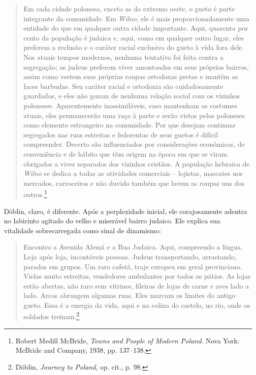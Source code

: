 \begin{quote}
Em cada cidade polonesa, exceto as do extremo oeste, o gueto é parte
integrante da comunidade. Em \textit{Wilno}, ele é mais proporcionadamente uma
entidade do que em qualquer outra cidade importante. Aqui, quarenta por
cento da população é judaica e, aqui, como em qualquer outro lugar, eles
preferem a reclusão e o caráter racial exclusivo do gueto à vida fora
dele. Nos atuais tempos modernos, nenhuma tentativa foi feita contra a
segregação; os judeus preferem viver amontoados em seus próprios
bairros, assim como vestem suas próprias roupas ortodoxas pretas e
mantêm as faces barbudas. Seu caráter racial e ortodoxia são
cuidadosamente guardados, e eles não gozam de nenhuma relação social com
os vizinhos poloneses. Aparentemente inassimiláveis, caso mantenham os
costumes atuais, eles permanecerão uma raça à parte e serão vistos pelos
poloneses como elemento estrangeiro na comunidade. Por que desejam
continuar segregados nas ruas estreitas e fedorentas de seus guetos é
difícil compreender. Decerto são influenciados por considerações
econômicas, de conveniência e de hábito que têm origem na época em que
se viram obrigados a viver separados dos vizinhos cristãos. A população
hebraica de \textit{Wilno} se dedica a todas as atividades comerciais -- lojistas,
mascates nos mercados, carroceiros e não duvido também que lavem as
roupas uns dos outros.\footnote{Robert Medill McBride, \textit{Towns and People of Modern Poland}. Nova York: McBride and Company, 1938, pp. 137--138.} 
\end{quote}

Döblin, claro, é diferente. Após a perplexidade inicial, ele
corajosamente adentra no labirinto agitado do velho e miserável bairro
judaico. Ele explica sua vitalidade sobrecarregada como sinal de
dinamismo:

\begin{quote}
Encontro a Avenida Alemã e a Rua Judaica. Aqui, compreendo a língua.
Loja após loja, incontáveis pessoas. Judeus transportando, arrastando,
parados em grupos. Um raro cafetã, traje europeu em geral provinciano.
Vielas muito estreitas, vendedores ambulantes por todos os pátios. As
lojas estão abertas, não raro sem vitrines, fileiras de lojas de carne e
aves lado a lado. Arcos abrangem algumas ruas. Eles marcam os limites do
antigo gueto. Essa é a energia da vida, aqui e na colina do castelo, no
rio, onde os soldados treinam.\footnote{Döblin, \textit{Journey to Poland}, op. cit., p. 98.} 
\end{quote}

